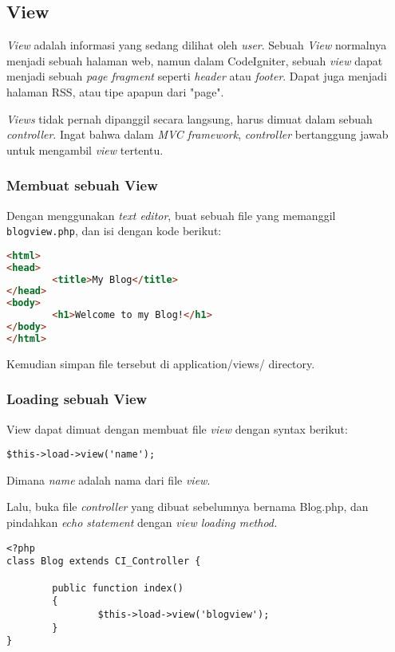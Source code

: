 \subsection{View}
\label{subs:view}
\textit{View} adalah informasi yang sedang dilihat oleh \textit{user}. Sebuah \textit{View} normalnya menjadi sebuah halaman web, namun dalam CodeIgniter, sebuah \textit{view} dapat menjadi sebuah \textit{page fragment} seperti \textit{header} atau \textit{footer}. Dapat juga menjadi halaman RSS, atau tipe apapun dari "page".

\textit{Views} tidak pernah dipanggil secara langsung, harus dimuat dalam sebuah \textit{controller}. Ingat bahwa dalam \textit{MVC framework}, \textit{controller} bertanggung jawab untuk mengambil \textit{view} tertentu.\cite{codeigniter:17} 

\subsubsection{Membuat sebuah View}
\label{sssec:view_1}
Dengan menggunakan \textit{text editor}, buat sebuah file yang memanggil \verb|blogview.php|, dan isi dengan kode berikut:\cite{codeigniter:17}
\begin{lstlisting}[frame=single, language=html]% 
<html>
<head>
        <title>My Blog</title>
</head>
<body>
        <h1>Welcome to my Blog!</h1>
</body>
</html>
\end{lstlisting}

Kemudian simpan file tersebut di application/views/ directory.

\subsubsection{Loading sebuah View}
\label{sssec:view_1}

View dapat dimuat dengan membuat file \textit{view} dengan syntax berikut:

\begin{lstlisting}[frame=single] 
$this->load->view('name');
\end{lstlisting}

Dimana \textit{name} adalah nama dari file \textit{view}.

Lalu, buka file \textit{controller} yang dibuat sebelumnya bernama Blog.php, dan pindahkan \textit{echo statement} dengan \textit{view loading method.}

\begin{lstlisting}[frame=single] 
<?php
class Blog extends CI_Controller {

        public function index()
        {
                $this->load->view('blogview');
        }
}
\end{lstlisting}

